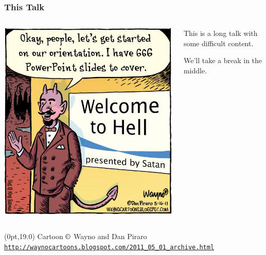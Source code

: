 \documentclass[10pt, xcolor=x11names, compress]{beamer}
\begin{document}
\begin{frame}
  \frametitle{This Talk}
  \begin{columns}
    \begin{column}{0.5\linewidth}
      \includegraphics[width=\linewidth]{images/bz-panel-05-16-11-wno.jpg}
    \end{column}
    \begin{column}{0.5\linewidth}
      This is a long talk with some difficult content.  

      \bigskip

      We'll take a break in the middle.
    \end{column}
  \end{columns}
  \begin{textblock*}{0.4\linewidth}(0pt,19.0\TPVertModule)%
    \tiny%
    Cartoon $\copyright$ Wayno and Dan Piraro
    \href{http://waynocartoons.blogspot.com/2011_05_01_archive.html}
    {\color{Blue4}\texttt{http://waynocartoons.blogspot.com/2011\_05\_01\_archive.html}}
  \end{textblock*}
\end{frame}
\end{document}
